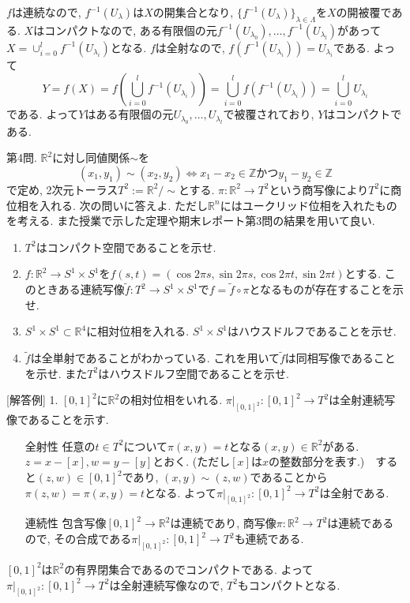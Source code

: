 \documentclass[dvipdfmx,a4paper,11pt]{article}
\newcommand{\R}{\mathbb{R}}
\newcommand{\Z}{\mathbb{Z}}
\theoremstyle{definition}
\begin{document}
{$f$は連続なので,  $f^{-1}(U_{\lambda})$は$X$の開集合となり, $\{f^{-1}(U_{\lambda})\}_{\lambda \in \Lambda}$を$X$の開被覆である.
$X$はコンパクトなので, ある有限個の元$f^{-1}(U_{\lambda_0}), \ldots, f^{-1}(U_{\lambda_l})$があって$X = \cup_{i=0}^{l} f^{-1}(U_{\lambda_i})$となる.
$f$は全射なので, $f(f^{-1}(U_{\lambda_i}))=U_{\lambda_i}$である.
よって
$$Y = f(X) = f\left(\bigcup_{i=0}^{l} f^{-1}(U_{\lambda_i})\right) = \bigcup_{i=0}^{l}f ( f^{-1}(U_{\lambda_i})) = \bigcup_{i=0}^{l}U_{\lambda_i}$$
である.
よって$Y$はある有限個の元$U_{\lambda_0}, \ldots, U_{\lambda_l}$で被覆されており, $Y$はコンパクトである.
\newpage

   {\large 第4問.}   $\R^2$に対し同値関係$\sim$を
$$
(x_1, y_1)\sim (x_2, y_2) \Leftrightarrow x_1 - x_2 \in \Z \text{かつ} y_1 - y_2 \in \Z 
$$
で定め, 2次元トーラス$T^2 := \R^2/\sim$とする.
$\pi : \R^2 \rightarrow T^2$という商写像により$T^2$に商位相を入れる.
次の問いに答えよ. ただし$\R^n$にはユークリッド位相を入れたものを考える. また授業で示した定理や期末レポート第3問の結果を用いて良い. %
\begin{enumerate}
 \setlength{\parskip}{0cm}
  \setlength{\itemsep}{0pt}
  \item $T^2$はコンパクト空間であることを示せ. %
\item $f : \R^2 \rightarrow S^1 \times S^1$を$f(s,t) = (\cos 2 \pi s, \sin 2 \pi s,\cos 2 \pi t, \sin 2 \pi t)$とする. このときある連続写像$\widetilde{f}: T^2 \rightarrow S^1 \times S^1$で$f = \widetilde{f} \circ \pi $となるものが存在することを示せ. 
\item $S^1 \times S^1 \subset \R^4$に相対位相を入れる. $S^1 \times S^1$はハウスドルフであることを示せ.
\item $\widetilde{f}$は全単射であることがわかっている. これを用いて$\widetilde{f}$は同相写像であることを示せ. また$T^2$はハウスドルフ空間であることを示せ.
  \end{enumerate}
\vspace{10pt}

[解答例]  1.  %
$[0,1]^2$に$\R^2$の相対位相をいれる. $\pi|_{[0,1]^2} : [0,1]^2 \to T^2$は全射連続写像であることを示す.
\begin{enumerate}
\item[全射性] 任意の$t \in T^2$について$\pi(x,y)=t$となる$(x,y) \in \R^2$がある. $z = x - [x], w = y-[y]$とおく. (ただし$[x]$は$x$の整数部分を表す.)　すると$(z,w) \in [0,1]^2$であり, $(x, y) \sim (z,w)$であることから$\pi(z,w) = \pi(x,y)=t$となる. よって$\pi|_{[0,1]^2} : [0,1]^2 \to T^2$は全射である.
\item[連続性] 包含写像$[0,1]^2 \to \R^2$は連続であり, 商写像$\pi : \R^2\to T^2$は連続であるので, その合成である$\pi|_{[0,1]^2} : [0,1]^2 \to T^2$も連続である.
\end{enumerate}
$[0,1]^2$は$\R^2$の有界閉集合であるのでコンパクトである. よって$\pi|_{[0,1]^2} : [0,1]^2 \to T^2$は全射連続写像なので, $T^2$もコンパクトとなる. 

}
\end{document}
